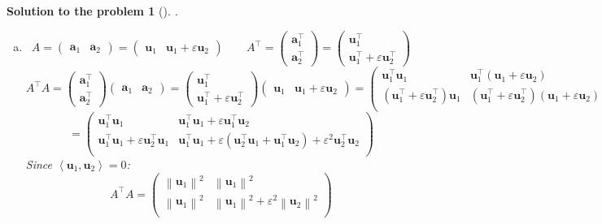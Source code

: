 \documentclass[12pt,a4]{article}
\newtheorem{solution}{Solution to the problem}
\newcommand{\ba}{{\mathbf a}}
\newcommand{\bu}{{\mathbf u}}
\newcommand{\sprod}[2]{\left \langle #1, #2 \right \rangle}
\newcommand{\norm}[1]{\left\lVert#1\right\rVert}
\begin{document}
\begin{solution}[]\rm .
\begin{enumerate}[(a)]
\item
\[
A = 
\begin{pmatrix} 
\ba_1 & \ba_2
\end{pmatrix} =
\begin{pmatrix} 
\bu_1 & \bu_1+\varepsilon\bu_2
\end{pmatrix}
\qquad
A^\top =
\begin{pmatrix} 
\ba_1^\top \\ \ba_2^\top
\end{pmatrix} =
\begin{pmatrix} 
\bu_1^\top \\ \bu_1^\top+\varepsilon\bu_2^\top
\end{pmatrix}
\]
\[
A^\top A = 
\begin{pmatrix} 
\ba_1^\top \\ \ba_2^\top
\end{pmatrix}
\begin{pmatrix} 
\ba_1 & \ba_2
\end{pmatrix}
=
\begin{pmatrix} 
\bu_1^\top \\ \bu_1^\top+\varepsilon\bu_2^\top
\end{pmatrix}
\begin{pmatrix} 
\bu_1 & \bu_1+\varepsilon\bu_2
\end{pmatrix}
=
\begin{pmatrix} 
\bu_1^\top \bu_1 & \bu_1^\top (\bu_1+\varepsilon\bu_2) \\
(\bu_1^\top+\varepsilon\bu_2^\top)\bu_1 & (\bu_1^\top+\varepsilon\bu_2^\top)(\bu_1+\varepsilon\bu_2) \\
\end{pmatrix}
=
\]
\[
=
\begin{pmatrix} 
\bu_1^\top \bu_1 &
\bu_1^\top \bu_1 + \varepsilon \bu_1^\top \bu_2\\
\bu_1^\top \bu_1 + \varepsilon\bu_2^\top \bu_1 &
\bu_1^\top \bu_1 + \varepsilon(\bu_2^\top \bu_1 + \bu_1^\top \bu_2) + \varepsilon^2 \bu_2^\top \bu_2\\
\end{pmatrix}
\]
Since $\sprod{\bu_1}{\bu_2} = 0$:
\[
A^\top A =
\begin{pmatrix} 
\norm{\bu_1}^2 & \norm{\bu_1}^2 \\
\norm{\bu_1}^2 & \norm{\bu_1}^2  + \varepsilon^2 \norm{\bu_2}^2\\
\end{pmatrix}
\]
\end{enumerate}
\end{solution}
\end{document}
